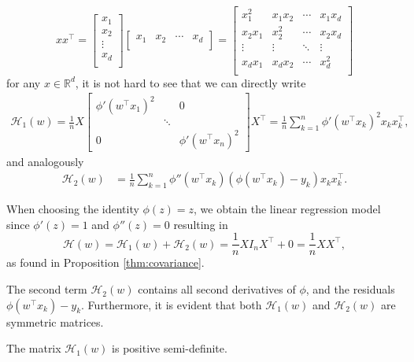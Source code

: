 \documentclass{article}
\begin{document}
\begin{equation}
xx^\top = \begin{bmatrix} x_1 \\ x_2 \\ \vdots \\ x_d \\ \end{bmatrix} \begin{bmatrix} x_1 & x_2 & \cdots & x_d \\ \end{bmatrix} = \begin{bmatrix} x_1^2 & x_1x_2 & \cdots & x_1x_d \\ x_2x_1 & x_2^2 & \cdots & x_2x_d \\ \vdots & \vdots & \ddots & \vdots \\ x_dx_1 & x_dx_2 & \cdots & x_d^2 \\ \end{bmatrix}
\end{equation}
for any $x\in\mathbb{R}^d$, it is not hard to see that we can directly write
\begin{align}
\mathcal{H}_1(w)=\frac{1}{n}X \begin{bmatrix} \phi'(w^\top x_1)^2 & & 0 \\ & \ddots & \\ 0 & & \phi'(w^\top x_n)^2\end{bmatrix} X^\top=\frac{1}{n}\sum_{k=1}^n\phi'(w^\top x_k)^2x_kx_k^\top,
\end{align}
and analogously
\begin{align}
\mathcal{H}_2(w) &= \frac{1}{n}\sum_{k=1}^n\phi''(w^\top x_k)(\phi(w^\top x_k)-y_k)x_kx_k^\top.
\end{align}
\bigskip
\par
When choosing the identity $\phi(z)=z$, we obtain the linear regression model since $\phi'(z)=1$ and $\phi''(z)=0$ resulting in
\begin{equation}
\mathcal{H}(w)=\mathcal{H}_1(w)+\mathcal{H}_2(w)=\frac{1}{n}X I_nX^\top+0=\frac{1}{n}XX^\top,
\end{equation}
as found in Proposition \ref{thm:covariance}.
\bigskip
\par
The second term $\mathcal{H}_2(w)$ contains all second derivatives of $\phi$, and the residuals 
\\
$\phi(w^\top x_k)-y_k$. Furthermore, it is evident that both $\mathcal{H}_1(w)$ and $\mathcal{H}_2(w)$ are symmetric matrices.
\bigskip
\\
\begin{lemma}
The matrix $\mathcal{H}_1(w)$ is positive semi-definite.
\end{lemma}
\end{document}
